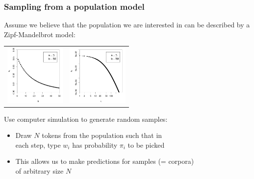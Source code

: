\documentclass[t]{beamer} %
\begin{document}
\begin{frame}
  \frametitle{Sampling from a population model}

  Assume we believe that the population we are interested in can be described
  by a Zipf-Mandelbrot model: 
  \begin{center}
    \begin{tabular}{cc}
      \includegraphics[width=30mm]{img/05-samples-zm-model} &
      \includegraphics[width=30mm]{img/05-samples-zm-model-log} 
    \end{tabular}
  \end{center}
  
  Use computer simulation to generate random samples:
  \begin{itemize}
  \item Draw $N$ tokens from the population such that in\\
    each step, type $w_i$ has probability $\pi_i$ to be picked
  \item This allows us to make predictions for samples (= corpora)\\
    of arbitrary size $N$
  \end{itemize}
\end{frame}
\end{document}
